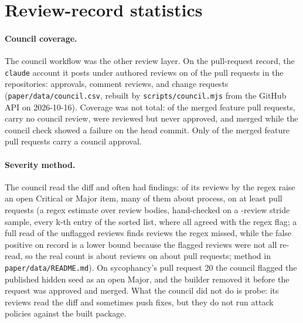 \section{Review-record statistics}
\label{app:reviewstats}

\paragraph{Council coverage.}
The council workflow was the other review layer. On the pull-request record, the \texttt{claude} account it posts under authored \councilReviews{} reviews on \councilPrsReviewed{} of the \buildersPrs{} pull requests in the \suitePackages{} repositories: \councilApproved{} approvals, \councilCommented{} comment reviews, and \councilChanges{} change requests (\texttt{paper/data/council.csv}, rebuilt by \texttt{scripts/council.mjs} from the GitHub API on 2026-10-16). Coverage was not total: of the \councilMergedFeature{} merged feature pull requests, \councilMergedNoReview{} carry no council review, \councilMergedNoApproval{} were reviewed but never approved, and \councilMergedCheckFail{} merged while the council check showed a failure on the head commit. Only \councilMergedApproved{} of the \councilMergedFeature{} merged feature pull requests carry a council approval.

\paragraph{Severity method.}
The council read the diff and often had findings: \councilSeverityReviews{} of its reviews by the regex raise an open Critical or Major item, many of them about process, on at least \councilSeverityPrs{} pull requests (a regex estimate over review bodies, hand-checked on a \councilSampleSize{}-review stride sample, every k-th entry of the sorted list, where all \councilSampleSize{} agreed with the regex flag; a full read of the unflagged reviews finds \councilSeverityRegexMissed{} reviews the regex missed, while the \councilSeverityRegexFalsePositives{} false positive on record is a lower bound because the flagged reviews were not all re-read, so the real count is about \councilSeverityReviewsRead{} reviews on about \councilSeverityPrsRead{} pull requests; method in \texttt{paper/data/README.md}). On sycophancy's pull request 20 the council flagged the published hidden seed as an open Major, and the builder removed it before the request was approved and merged. What the council did not do is probe: its reviews read the diff and sometimes push fixes, but they do not run attack policies against the built package.

